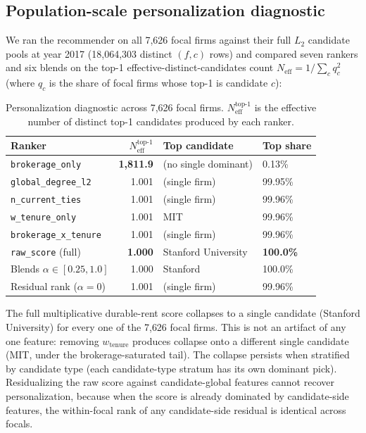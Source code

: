 \documentclass[11pt,letterpaper]{article}
\begin{document}
\subsection{Population-scale personalization diagnostic}

We ran the recommender on all 7{,}626 focal firms against their full
$L_2$ candidate pools at year 2017 (18{,}064{,}303 distinct
$(f, c)$ rows) and compared seven rankers and six blends on the
top-1 effective-distinct-candidates count
$N_{\mathrm{eff}} = 1 / \sum_c q_c^2$ (where $q_c$ is the share of
focal firms whose top-1 is candidate $c$):

\begin{table}[H]
\centering
\footnotesize
\caption{Personalization diagnostic across 7{,}626 focal firms.
$N_{\mathrm{eff}}^{\text{top-1}}$ is the effective number of
distinct top-1 candidates produced by each ranker.}
\label{tab:personalization}
\begin{tabular}{lrll}
\toprule
Ranker & $N_{\mathrm{eff}}^{\text{top-1}}$ & Top candidate & Top share \\
\midrule
\texttt{brokerage\_only}        & \textbf{1{,}811.9} & (no single dominant) & 0.13\% \\
\texttt{global\_degree\_l2}     & 1.001 & (single firm) & 99.95\% \\
\texttt{n\_current\_ties}       & 1.001 & (single firm) & 99.96\% \\
\texttt{w\_tenure\_only}        & 1.001 & MIT           & 99.96\% \\
\texttt{brokerage\_x\_tenure}   & 1.001 & (single firm) & 99.96\% \\
\texttt{raw\_score} (full)      & \textbf{1.000} & Stanford University & \textbf{100.0\%} \\
Blends $\alpha \in [0.25, 1.0]$ & 1.000 & Stanford & 100.0\% \\
Residual rank ($\alpha = 0$)    & 1.001 & (single firm) & 99.96\% \\
\bottomrule
\end{tabular}
\end{table}

The full multiplicative durable-rent score collapses to a single
candidate (Stanford University) for every one of the 7{,}626 focal
firms.  This is not an artifact of any one feature: removing
$w_{\text{tenure}}$ produces collapse onto a different single
candidate (MIT, under the brokerage-saturated tail).  The collapse
persists when stratified by candidate type (each candidate-type
stratum has its own dominant pick).  Residualizing the raw score
against candidate-global features cannot recover personalization,
because when the score is already dominated by candidate-side
features, the within-focal rank of any candidate-side residual is
identical across focals.
\end{document}
